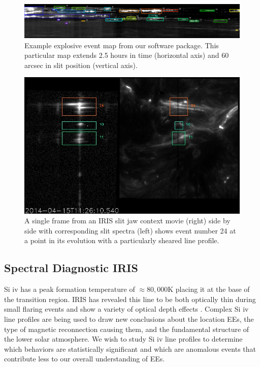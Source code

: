 \documentclass[]{aastex6}
\begin{document}
	\begin{figure}
		
		\centerline{\includegraphics[scale=.5]{./NESSF_img/ee_map.eps}}
		\caption{Example explosive event map from our software package.  This particular map extends 2.5 hours in time (horizontal axis) and 60 arcsec in slit position (vertical axis).}
		\label{fig:eemap}
	\end{figure}
	
	\begin{figure}
		
		\centerline{\includegraphics[scale=.4]{NESSF_img/01481.jpg}}
		\caption{A single frame from an IRIS slit jaw context movie (right) side by side with corresponding slit spectra (left) shows event number 24 at a point in its evolution with a particularly sheared line profile.}
		\label{fig:eemovie}
	\end{figure}
	

	
	\subsection{Spectral Diagnostic IRIS}
	Si {\sc iv} has a peak formation temperature of $\approx 80,000$K placing it at the base of the transition region.  IRIS has revealed this line to be both optically thin during small flaring events and show a variety of optical depth effects \citep{Peter2014,Yan2015}.  Complex Si {\sc iv} line profiles are being used to draw new conclusions about the location EEs, the type of magnetic reconnection causing them, and the fundamental structure of the lower solar atmosphere.  We wish to study Si {\sc iv} line profiles to determine which behaviors are statistically significant and which are anomalous events that contribute less to our overall understanding of EEs.
	
\end{document}
